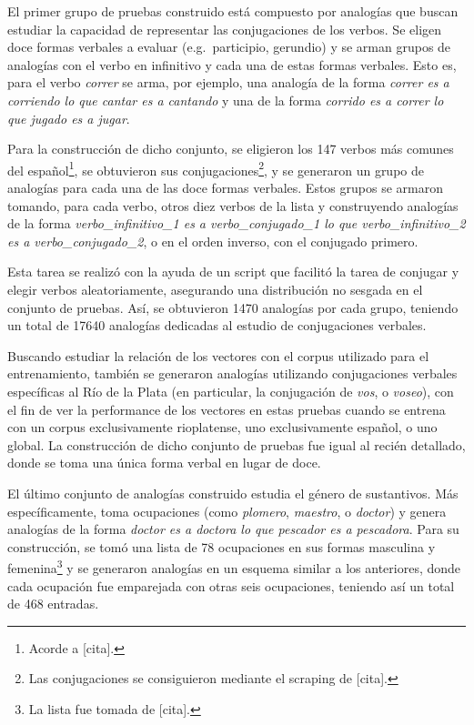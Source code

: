 El primer grupo de pruebas construido está compuesto por analogías que buscan estudiar la capacidad
de representar las conjugaciones de los verbos. Se eligen doce formas verbales a evaluar
(e.g.\ participio, gerundio) y se arman grupos de analogías con el verbo en infinitivo y cada una de
estas formas verbales. Esto es, para el verbo \textit{correr} se arma, por ejemplo, una analogía de
la forma \textit{correr es a corriendo lo que cantar es a cantando} y una de la forma
\textit{corrido es a correr lo que jugado es a jugar}.

Para la construcción de dicho conjunto, se eligieron los 147 verbos más comunes del
español\footnote{Acorde a [cita].}, se obtuvieron sus conjugaciones\footnote{Las conjugaciones se
consiguieron mediante el scraping de [cita].}, y se generaron un grupo de analogías para cada una de
las doce formas verbales. Estos grupos se armaron tomando, para cada verbo, otros diez verbos de la
lista y construyendo analogías de la forma \textit{verbo\_infinitivo\_1 es a verbo\_conjugado\_1 lo
que verbo\_infinitivo\_2 es a verbo\_conjugado\_2}, o en el orden inverso, con el conjugado primero.

Esta tarea se realizó con la ayuda de un script que facilitó la tarea de conjugar y elegir verbos
aleatoriamente, asegurando una distribución no sesgada en el conjunto de pruebas. Así, se obtuvieron
1470 analogías por cada grupo, teniendo un total de 17640 analogías dedicadas al estudio de
conjugaciones verbales.


Buscando estudiar la relación de los vectores con el corpus utilizado para el entrenamiento, también
se generaron analogías utilizando conjugaciones verbales específicas al Río de la Plata (en
particular, la conjugación de \textit{vos}, o \textit{voseo}), con el fin de ver la performance de
los vectores en estas pruebas cuando se entrena con un corpus exclusivamente rioplatense, uno
exclusivamente español, o uno global. La construcción de dicho conjunto de pruebas fue igual al
recién detallado, donde se toma una única forma verbal en lugar de doce.


El último conjunto de analogías construido estudia el género de sustantivos. Más específicamente,
toma ocupaciones (como \textit{plomero}, \textit{maestro}, o \textit{doctor}) y genera analogías de
la forma \textit{doctor es a doctora lo que pescador es a pescadora}. Para su construcción, se tomó
una lista de 78 ocupaciones en sus formas masculina y femenina\footnote{La lista fue tomada de
[cita].} y se generaron analogías en un esquema similar a los anteriores, donde cada ocupación fue
emparejada con otras seis ocupaciones, teniendo así un total de 468 entradas.


